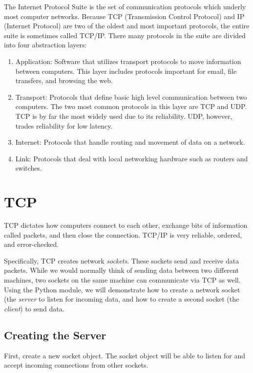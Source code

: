 
The Internet Protocol Suite is the set of communication protocols which underly most computer networks.
Because TCP (Transmission Control Protocol) and IP (Internet Protocol) are two of the oldest and most important protocols, the entire suite is sometimes called TCP/IP.
There many protocols in the suite are divided into four abstraction layers:
\begin{enumerate}
\item Application: Software that utilizes transport protocols to move information between computers.
This layer includes protocols important for email, file transfers, and browsing the web.
\item Transport: Protocols that define basic high level communication between two computers.
The two most common protocols in this layer are TCP and UDP.
TCP is by far the most widely used due to its reliability.
UDP, however, trades reliability for low latency.
\item Internet: Protocols that handle routing and movement of data on a network.
\item Link: Protocols that deal with local networking hardware such as routers and switches.
\end{enumerate}

\section*{TCP}
TCP dictates how computers connect to each other, exchange bits of information called packets, and then close the connection.
TCP/IP is very reliable, ordered, and error-checked.

Specifically, TCP creates network \textit{sockets}. These sockets send and receive data packets. While we would normally think of sending data between two different machines, two sockets on the same machine can communicate via TCP as well. Using the Python  module, we will demonstrate how to create a network socket (the \textit{server} to listen for incoming data, and how to create a second socket (the \textit{client}) to send data.



\subsection*{Creating the Server}
First, create a new socket object.
The socket object will be able to listen for and accept incoming connections from other sockets.


